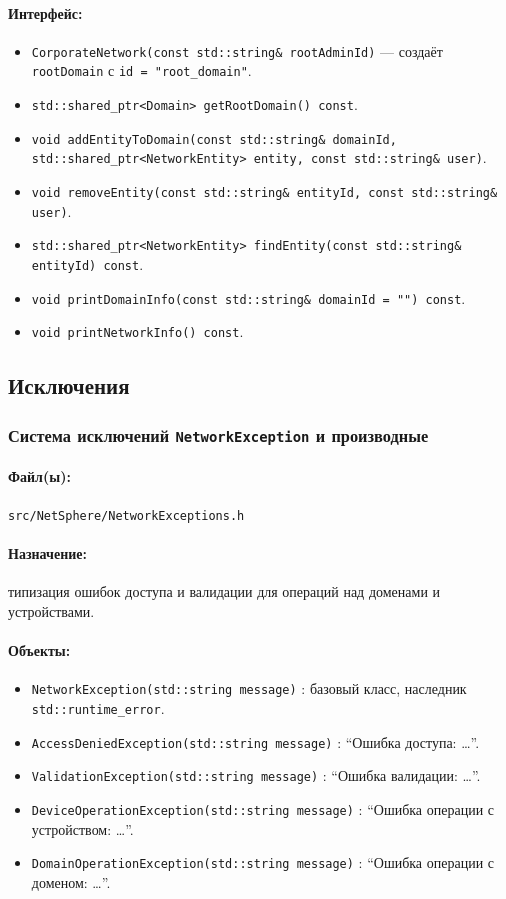 \documentclass[14pt,a4paper]{extarticle}
\begin{document}
\paragraph{Интерфейс:}
\begin{itemize}
  \item \texttt{CorporateNetwork(const std::string\& rootAdminId)} --- создаёт \texttt{rootDomain} с \texttt{id = "root\_domain"}.
  \item \texttt{std::shared\_ptr<Domain> getRootDomain() const}.
  \item \texttt{void addEntityToDomain(const std::string\& domainId, std::shared\_ptr<NetworkEntity> entity, const std::string\& user)}.
  \item \texttt{void removeEntity(const std::string\& entityId, const std::string\& user)}.
  \item \texttt{std::shared\_ptr<NetworkEntity> findEntity(const std::string\& entityId) const}.
  \item \texttt{void printDomainInfo(const std::string\& domainId = "") const}.
  \item \texttt{void printNetworkInfo() const}.
\end{itemize}

\subsection{Исключения}
\subsubsection{Система исключений \texttt{NetworkException} и производные}
\paragraph{Файл(ы):} \texttt{src/NetSphere/NetworkExceptions.h}
\paragraph{Назначение:} типизация ошибок доступа и валидации для операций над доменами и устройствами.
\paragraph{Объекты:}
\begin{itemize}
  \item \texttt{NetworkException(std::string message)} : базовый класс, наследник \texttt{std::runtime\_error}.
  \item \texttt{AccessDeniedException(std::string message)} : ``Ошибка доступа: \dots''.
  \item \texttt{ValidationException(std::string message)} : ``Ошибка валидации: \dots''.
  \item \texttt{DeviceOperationException(std::string message)} : ``Ошибка операции с устройством: \dots''.
  \item \texttt{DomainOperationException(std::string message)} : ``Ошибка операции с доменом: \dots''.
\end{itemize}
\end{document}
